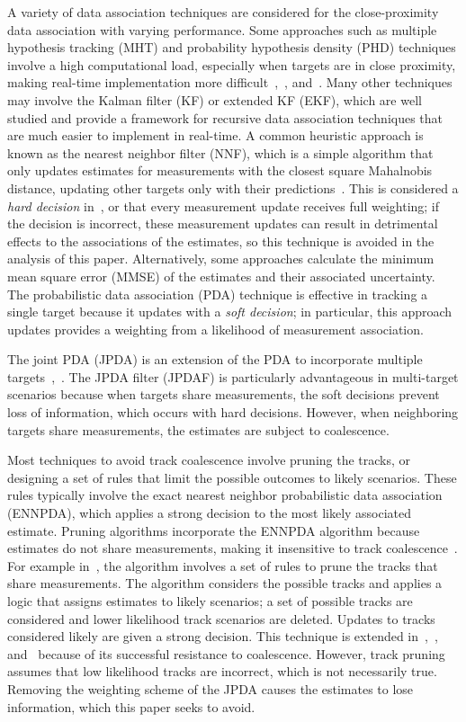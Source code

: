 \documentclass[letterpaper, 10pt, conference]{ieeeconf}
\begin{document}
A variety of data association techniques are considered for the close-proximity data association with varying performance.
Some approaches such as multiple hypothesis tracking (MHT) and probability hypothesis density (PHD) techniques involve a high computational load, especially when targets are in close proximity, making real-time implementation more difficult~\cite{MHT1},~\cite{PHD1}, and~\cite{PHD2}.
Many other techniques may involve the Kalman filter (KF) or extended KF (EKF), which are well studied and provide a framework for recursive data association techniques that are much easier to implement in real-time.
A common heuristic approach is known as the nearest neighbor filter (NNF), which is a simple algorithm that only updates estimates for measurements with the closest square Mahalnobis distance, updating other targets only with their predictions~\cite{NN2}.
This is considered a \emph{hard decision} in~\cite{JPDAF1}, or that every measurement update receives full weighting; if the decision is incorrect, these measurement updates can result in detrimental effects to the associations of the estimates, so this technique is avoided in the analysis of this paper.
Alternatively, some approaches calculate the minimum mean square error (MMSE) of the estimates and their associated uncertainty.
The probabilistic data association (PDA) technique is effective in tracking a single target because it updates with a \emph{soft decision}; in particular, this approach updates provides a weighting from a likelihood of measurement association.

The joint PDA (JPDA) is an extension of the PDA to incorporate multiple targets~\cite{JPDAF1},~\cite{TrackDataAssoc}.
The JPDA filter (JPDAF) is particularly advantageous in multi-target scenarios because when targets share measurements, the soft decisions prevent loss of information, which occurs with hard decisions.
However, when neighboring targets share measurements, the estimates are subject to coalescence.

Most techniques to avoid track coalescence involve pruning the tracks, or designing a set of rules that limit the possible outcomes to likely scenarios. These rules typically involve the exact nearest neighbor probabilistic data association (ENNPDA), which applies a strong decision to the most likely associated estimate. Pruning algorithms incorporate the ENNPDA algorithm because  estimates do not share measurements, making it insensitive to track coalescence~\cite{Coal1}. For example in~\cite{Fitzgerald}, the algorithm involves a set of rules to prune the tracks that share measurements. The algorithm considers the possible tracks and applies a logic that assigns estimates to likely scenarios; a set of possible tracks are considered and lower likelihood track scenarios are deleted. Updates to tracks considered likely are given a strong decision. This technique is extended in~\cite{Coal_d},~\cite{Coal_e}, and~\cite{Coal_c} because of its successful resistance to coalescence. However, track pruning assumes that low likelihood tracks are incorrect, which is not necessarily true. Removing the weighting scheme of the JPDA causes the estimates to lose information, which this paper seeks to avoid.
\end{document}
